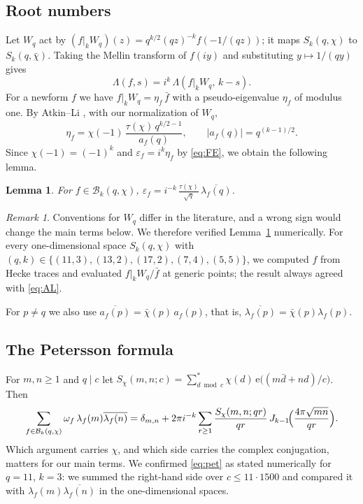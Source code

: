 \documentclass[11pt]{amsart}
\newtheorem{lemma}[theorem]{Lemma}
\theoremstyle{remark}
\newtheorem{remark}[theorem]{Remark}
\newcommand{\eps}{\varepsilon}
\newcommand{\e}{\mathrm{e}}
\newcommand{\cB}{\mathcal{B}}
\newcommand{\ov}{\overline}
\begin{document}
\subsection{Root numbers}
Let $W_q$ act by $(f|_kW_q)(z)=q^{k/2}(qz)^{-k}f(-1/(qz))$; it maps $S_k(q,\chi)$ to $S_k(q,\bar\chi)$. Taking the Mellin transform of $f(iy)$ and substituting $y\mapsto1/(qy)$ gives
\begin{equation}\label{eq:FE}
\Lambda(f,s)=i^k\,\Lambda(f|_kW_q,\,k-s).
\end{equation}
For a newform $f$ we have $f|_kW_q=\eta_f\,\bar f$ with a pseudo-eigenvalue $\eta_f$ of modulus one. By Atkin--Li \cite[Thm.~2.1]{AL}, with our normalization of $W_q$,
\begin{equation}\label{eq:AL}
\eta_f=\chi(-1)\,\frac{\tau(\chi)\,q^{k/2-1}}{a_f(q)},\qquad |a_f(q)|=q^{(k-1)/2}.
\end{equation}
Since $\chi(-1)=(-1)^k$ and $\eps_f=i^k\eta_f$ by \eqref{eq:FE}, we obtain the following lemma.

\begin{lemma}\label{lem:root}
For $f\in\cB_k(q,\chi)$, $\displaystyle \eps_f=i^{-k}\,\frac{\tau(\chi)}{\sqrt q}\,\ov{\lambda_f(q)}$.
\end{lemma}

\begin{remark}
Conventions for $W_q$ differ in the literature, and a wrong sign would change the main terms below. We therefore verified Lemma~\ref{lem:root} numerically. For every one-dimensional space $S_k(q,\chi)$ with $(q,k)\in\{(11,3),(13,2),(17,2),(7,4),(5,5)\}$, we computed $f$ from Hecke traces and evaluated $f|_kW_q/\bar f$ at generic points; the result always agreed with \eqref{eq:AL}.
\end{remark}

For $p\ne q$ we also use $\ov{a_f(p)}=\bar\chi(p)\,a_f(p)$, that is, $\ov{\lambda_f(p)}=\bar\chi(p)\lambda_f(p)$.

\subsection{The Petersson formula}
For $m,n\ge1$ and $q\mid c$ let $S_\chi(m,n;c)=\sum_{d\bmod c}^{*}\chi(d)\,\e\bigl((m\bar d+nd)/c\bigr)$. Then \cite[Prop.~14.5]{IK}
\begin{equation}\label{eq:pet}
\sum_{f\in\cB_k(q,\chi)}\omega_f\,\lambda_f(m)\ov{\lambda_f(n)}=\delta_{m,n}+2\pi i^{-k}\sum_{r\ge1}\frac{S_\chi(m,n;qr)}{qr}\,J_{k-1}\!\Bigl(\frac{4\pi\sqrt{mn}}{qr}\Bigr).
\end{equation}
Which argument carries $\chi$, and which side carries the complex conjugation, matters for our main terms. We confirmed \eqref{eq:pet} as stated numerically for $q=11$, $k=3$: we summed the right-hand side over $c\le11\cdot1500$ and compared it with $\lambda_f(m)\ov{\lambda_f(n)}$ in the one-dimensional spaces.
\end{document}

